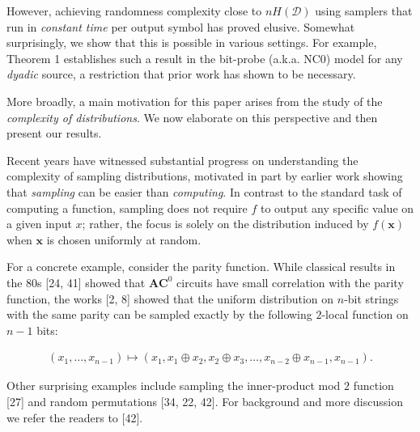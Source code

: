 \documentclass[10pt,a4paper]{article}
\begin{document}
However, achieving randomness complexity close to $nH(\mathcal{D})$ using samplers that run in \emph{constant time} per output symbol has proved elusive.
Somewhat surprisingly, we show that this is possible in various settings.
For example, Theorem 1 establishes such a result in the bit-probe (a.k.a. NC0) model for any \emph{dyadic} source, a restriction that prior work has shown to be necessary.\par




More broadly, a main motivation for this paper arises from the study of the \emph{complexity of distributions}. We now elaborate on this perspective and then present our results.\par




Recent years have witnessed substantial progress on understanding the complexity of sampling distributions, motivated in part by earlier work showing that \emph{sampling} can be easier than \emph{computing}.
In contrast to the standard task of computing a function, sampling does not require $f$ to output any specific value on a given input $x$; rather, the focus is solely on the distribution induced by $f(\boldsymbol{x})$ when $\boldsymbol{x}$ is chosen uniformly at random.\par




For a concrete example, consider the parity function.
While classical results in the 80s [24, 41] showed that $\mathbf{AC}^{0}$ circuits have small correlation with the parity function, the works [2, 8] showed that the uniform distribution on $n$-bit strings with the same parity can be sampled exactly by the following $2$-local function on $n-1$ bits:\par


\[\begin{gathered}
(x_{1},\ldots,x_{n-1})\mapsto(x_{1},x_{1}\oplus x_{2},x_{2}\oplus x_{3},\ldots,x_{n-2}\oplus x_{n-1},x_{n-1}).
\end{gathered}\]


Other surprising examples include sampling the inner-product mod $2$ function [27] and random permutations [34, 22, 42].
For background and more discussion we refer the readers to [42].\par
\end{document}
